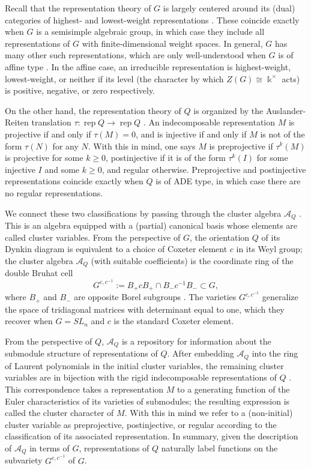 \documentclass[12pt]{amsart}
\newcommand{\sayDR}[1]{\say[DR]{\color{red}{\bf DR:}\;#1}}
\newcommand{\cA}{\mathcal{A}}
\newcommand{\kk}{\Bbbk}
\newcommand{\rep}{\operatorname{rep}}
\newcommand{\Qrep}{M}
\theoremstyle{remark}
\numberwithin{equation}{section}
\numberwithin{figure}{section}
\begin{document}
Recall that the representation theory of $G$ is largely centered around its (dual) categories of highest- and lowest-weight representations \cite{Kac90,Kum02}.
These coincide exactly when $G$ is a semisimple algebraic group, in which case they include all representations of $G$ with finite-dimensional weight spaces.
In general, $G$ has many other such representations, which are only well-understood when $G$ is of affine type \cite{Cha86,CP88}. 
In the affine case, an irreducible representation is highest-weight, lowest-weight, or neither if its level (the character by which $Z(G) \cong \kk^\times$ acts) is positive, negative, or zero respectively.

On the other hand, the representation theory of $Q$ is organized by the Auslander-Reiten translation $\tau: \rep Q \to \rep Q$ \cite{ASS06}.
An indecomposable representation $M$ is projective if and only if $\tau(M) = 0$, and is injective if and only if $M$ is not of the form $\tau(N)$ for any $N$.
With this in mind, one says $M$ is preprojective if $\tau^k(M)$ is projective for some $k\ge 0$, postinjective if it is of the form $\tau^k(I)$ for some injective $I$ and some $k\ge0$, and regular otherwise.
Preprojective and postinjective representations coincide exactly when $Q$ is of ADE type, in which case there are no regular representations.

We connect these two classifications by passing through the cluster algebra $\cA_Q$ \cite{FZ02}.
This is an algebra equipped with a (partial) canonical basis whose elements are called cluster variables.
From the perspective of $G$, the orientation $Q$ of its Dynkin diagram is equivalent to a choice of Coxeter element $c$ in its Weyl group; the cluster algebra $\cA_Q$ (with suitable coefficients) is the coordinate ring of the double Bruhat cell
\[
  G^{c,c^{-1}} := B_+ c B_+ \cap B_- c^{-1} B_- \subset G,
\]
where $B_+$ and $B_-$ are opposite Borel subgroups \cite{BFZ05,Wil13}.
The varieties $G^{c,c^{-1}}$ generalize the space of tridiagonal matrices with determinant equal to one, which they recover when $G=SL_n$ and $c$ is the standard Coxeter element.

From the perspective of $Q$, $\cA_Q$ is a repository for information about the submodule structure of representations of $Q$.
After embedding $\cA_Q$ into the ring of Laurent polynomials in the initial cluster variables, the remaining cluster variables are in bijection with the rigid indecomposable representations of $Q$ \cite{CC06,CK06}.
This correspondence takes a representation $\Qrep$ to a generating function of the Euler characteristics of its varieties of submodules; the resulting expression is called the cluster character of $\Qrep$.
With this in mind we refer to a (non-initial) cluster variable as preprojective, postinjective, or regular according to the classification of its associated representation.
In summary, given the description of $\cA_Q$ in terms of $G$, representations of $Q$ naturally label functions on the subvariety $G^{c,c^{-1}}$ of $G$. 
\end{document}
